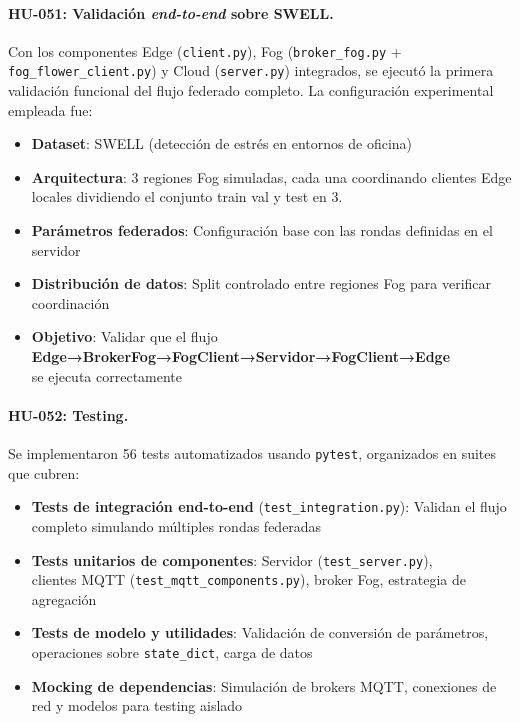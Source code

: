 \documentclass{report}
\begin{document}
\vspace{0.15em}
\paragraph{HU-051: Validación \emph{end-to-end} sobre SWELL.}
Con los componentes Edge (\texttt{client.py}), Fog (\texttt{broker\_fog.py} + \texttt{fog\_flower\_client.py}) y Cloud (\texttt{server.py}) integrados, se ejecutó la primera validación funcional del flujo federado completo. La configuración experimental empleada fue:

\begin{itemize}
    \item \textbf{Dataset}: SWELL (detección de estrés en entornos de oficina)
    \item \textbf{Arquitectura}: 3 regiones Fog simuladas, cada una coordinando clientes Edge locales dividiendo el conjunto train val y test en 3.
    \item \textbf{Parámetros federados}: Configuración base con las rondas definidas en el servidor
    \item \textbf{Distribución de datos}: Split controlado entre regiones Fog para verificar coordinación
    \item \textbf{Objetivo}: Validar que el flujo\\
    \textbf{Edge→BrokerFog→FogClient→Servidor→FogClient→Edge }\\se ejecuta correctamente
\end{itemize}



\vspace{0.15em}
\paragraph{HU-052: Testing.}
 Se implementaron 56 tests automatizados usando \texttt{pytest}, organizados en suites que cubren:

\begin{itemize}
    \item \textbf{Tests de integración end-to-end} (\texttt{test\_integration.py}): Validan el flujo completo simulando múltiples rondas federadas
    \item \textbf{Tests unitarios de componentes}: Servidor (\texttt{test\_server.py}), \\clientes MQTT (\texttt{test\_mqtt\_components.py}), broker Fog, estrategia de agregación
    \item \textbf{Tests de modelo y utilidades}: Validación de conversión de parámetros, operaciones sobre \texttt{state\_dict}, carga de datos
    \item \textbf{Mocking de dependencias}: Simulación de brokers MQTT, conexiones de red y modelos para testing aislado
\end{itemize}
\end{document}
